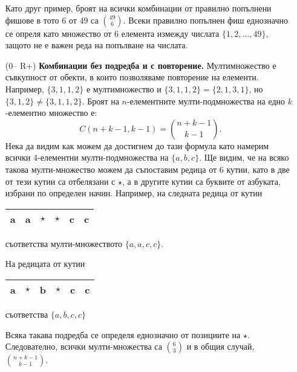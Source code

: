 \begin{enumerate}
  Като друг пример, броят на всички комбинации от правилно попълнени фишове в тото 6 от 49 са $\binom{49}{6}$.
  Всеки правилно попълнен фиш еднозначно се опреля като множество от 6 елемента измежду числата $\{1,2,\dots,49\}$,
  защото не е важен реда на попълване на числата.
\item[(0-- R+)]
  {\bf Комбинации без подредба и с повторение.}
  Мултимножество е съвкупност от обекти, в които позволяваме повторение на елементи.
  Например, $\{3,1,1,2\}$ е мултимножество и $\{3,1,1,2\} = \{2,1,3,1\}$,
  но $\{3,1,2\} \neq \{3,1,1,2\}$.
  Броят на $n$-елементните мулти-подмножества на едно $k$-елементно множество е:
  \[C(n+k-1,k-1) = \binom{n+k-1}{k-1}.\]
  Нека да видим как можем да достигнем до тази формула като намерим всички 4-елементни мулти-подмножества
  на $\{a,b,c\}$. Ще видим, че на всяко такова мулти-множество можем да съпоставим редица от 6 кутии,
  като в две от тези кутии са отбелязани с $\star$, а в другите кутии са буквите от азбуката, избрани по определен начин.
  Например, на следната редица от кутии
  \begin{tabular}{|l|l|l|l|l|l|}
    \hline
    a & a & $\star$ & $\star$ & c & c \\
    \hline
  \end{tabular}
  съответства мулти-множеството $\{a,a,c,c\}$.

  На редицата от кутии
  \begin{tabular}{|l|l|l|l|l|l|}
    \hline
    a & $\star$ & b & $\star$ & c & c \\
    \hline
  \end{tabular}
  съответства $\{a,b,c,c\}$
  
  Всяка такава подредба се определя еднозначно от позициите на $\star$.
  Следователно, всички мулти-множества са $\binom{6}{3}$ и в общия случай,
  $\binom{n+k-1}{k-1}$.
  
\end{enumerate}



